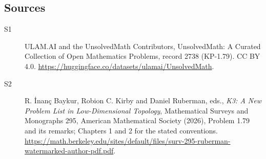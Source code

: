 \documentclass[11pt]{article}
\begin{document}
\subsection{Sources}
\begin{description}
\item[\hypertarget{source:2738:1}{S1}] ULAM.AI and the UnsolvedMath Contributors, UnsolvedMath: A Curated Collection of Open Mathematics Problems, record 2738 (KP-1.79). CC BY 4.0. \url{https://huggingface.co/datasets/ulamai/UnsolvedMath}.
\item[\hypertarget{source:2738:2}{S2}] R. İnanç Baykur, Robion C. Kirby and Daniel Ruberman, eds., \emph{K3: A New Problem List in Low-Dimensional Topology}, Mathematical Surveys and Monographs 295, American Mathematical Society (2026), Problem 1.79 and its remarks; Chapters 1 and 2 for the stated conventions. \url{https://math.berkeley.edu/sites/default/files/surv-295-ruberman-watermarked-author-pdf.pdf}.
\end{description}
\label{end:2738}
\end{document}
